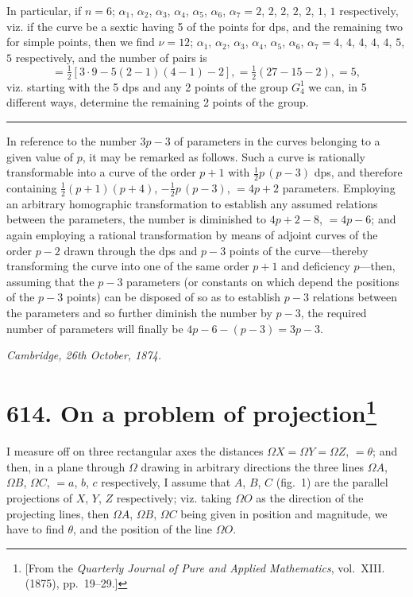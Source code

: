 \documentclass[11pt,a4paper]{article}
\theoremstyle{plain}
\theoremstyle{definition}
\theoremstyle{remark}
\begin{document}
In particular, if $n = 6$; $\alpha_1$, $\alpha_2$, $\alpha_3$, $\alpha_4$, $\alpha_5$, $\alpha_6$, $\alpha_7 = 2$, $2$, $2$, $2$, $2$, $1$, $1$ respectively, viz. if the curve be a sextic having 5 of the points for dps, and the remaining two for simple points, then we find $\nu = 12$; $\alpha_1$, $\alpha_2$, $\alpha_3$, $\alpha_4$, $\alpha_5$, $\alpha_6$, $\alpha_7 = 4$, $4$, $4$, $4$, $4$, $5$, $5$ respectively, and the number of pairs is
\[
= \tfrac{1}{2}[3 \cdot 9 - 5(2-1)(4-1) - 2], = \tfrac{1}{2}(27 - 15 - 2), = 5,
\]
viz. starting with the 5 dps and any 2 points of the group $G_4^1$ we can, in 5 different ways, determine the remaining 2 points of the group.

\rule{4cm}{0.4pt}

In reference to the number $3p-3$ of parameters in the curves belonging to a given value of $p$, it may be remarked as follows. Such a curve is rationally transformable into a curve of the order $p+1$ with $\frac{1}{2}p\,(p-3)$ dps, and therefore containing $\frac{1}{2}(p+1)(p+4)$, $-\frac{1}{2}p\,(p-3)$, $= 4p+2$ parameters. Employing an arbitrary homographic transformation to establish any assumed relations between the parameters, the number is diminished to $4p+2-8$, $= 4p-6$; and again employing a rational transformation by means of adjoint curves of the order $p-2$ drawn through the dps and $p-3$ points of the curve---thereby transforming the curve into one of the same order $p+1$ and deficiency $p$---then, assuming that the $p-3$ parameters (or constants on which depend the positions of the $p-3$ points) can be disposed of so as to establish $p-3$ relations between the parameters and so further diminish the number by $p-3$, the required number of parameters will finally be $4p-6-(p-3) = 3p-3$.

\begin{flushright}
\textit{Cambridge, 26th October, 1874.}
\end{flushright}

\newpage
\section[On a problem of projection]{\textbf{614.} On a problem of projection\footnote{[From the \textit{Quarterly Journal of Pure and Applied Mathematics}, vol.~XIII. (1875), pp.~19--29.]}}

I measure off on three rectangular axes the distances $\Omega X = \Omega Y = \Omega Z$, $= \theta$; and then, in a plane through $\Omega$ drawing in arbitrary directions the three lines $\Omega A$, $\Omega B$, $\Omega C$, $= a$, $b$, $c$ respectively, I assume that $A$, $B$, $C$ (fig.~1) are the parallel projections of $X$, $Y$, $Z$ respectively; viz. taking $\Omega O$ as the direction of the projecting lines, then $\Omega A$, $\Omega B$, $\Omega C$ being given in position and magnitude, we have to find $\theta$, and the position of the line $\Omega O$.
\end{document}
